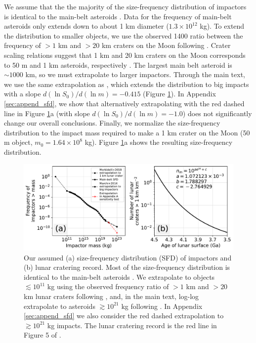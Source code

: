 \documentclass[manuscript]{aastex63}
\begin{document}
We assume that the the majority of the size-frequency distribution of impactors is identical to the main-belt asteroids \citep[Extended Data Figure 1 in][]{Marchi_2014}. Data for the frequency of main-belt asteroids only extends down to about 1 km diameter ($1.3 \times 10^{12} $ kg). To extend the distribution to smaller objects, we use the observed 1400 ratio between the frequency of $> 1$ km and $> 20$ km craters on the Moon following \citet{Morbidelli_2018}. Crater scaling relations suggest that 1 km and 20 km craters on the Moon corresponds to 50 m and 1 km asteroids, respectively \citep{Morbidelli_2018}. The largest main belt asteroid is $\sim 1000$ km, so we must extrapolate to larger impactors. Through the main text, we use the same extrapolation as \citet{Marchi_2014}, which extends the distribution to big impacts with a slope $d (\ln S_0)/d (\ln m) = - 0.415$ (Figure \ref{fig:sfd_and_flux}). In Appendix \ref{sec:append_sfd}, we show that alternatively extrapolating with the red dashed line in Figure \ref{fig:sfd_and_flux}a (with slope $d (\ln S_0)/d (\ln m) = - 1.0$) does not significantly change our overall conclusions. Finally, we normalize the size-frequency distribution to the impact mass required to make a 1 km crater on the Moon (50 m object, $m_0 = 1.64 \times 10^{8}$ kg). Figure \ref{fig:sfd_and_flux}a shows the resulting size-frequency distribution.

\begin{figure}
  \centering
  \includegraphics[width=1.0\textwidth]{figures/SFD_and_flux.pdf}
  \caption{Our assumed (a) size-frequency distribution (SFD) of impactors and (b) lunar cratering record. Most of the size-frequency distribution is identical to the main-belt asteroids \citep[Extended Data Figure 1 in][]{Marchi_2014}. We extrapolate to objects $\lesssim 10^{11}$ kg using the observed frequency ratio of $> 1$ km and $> 20$ km lunar craters following \citet{Morbidelli_2018}, and, in the main text, log-log extrapolate to asteroids $\gtrsim 10^{21}$ kg following \citet{Marchi_2014}. In Appendix \ref{sec:append_sfd} we also consider the red dashed extrapolation to $\gtrsim 10^{21}$ kg impacts. The lunar cratering record is the red line in Figure 5 of \citet{Morbidelli_2018}.}
  \label{fig:sfd_and_flux}
\end{figure}
\end{document}
